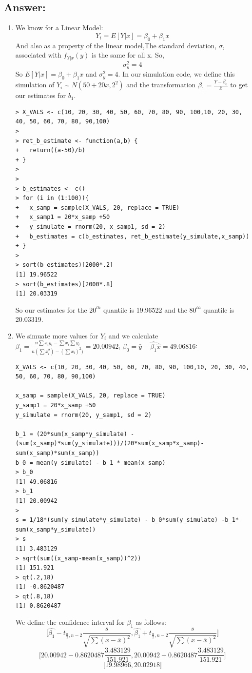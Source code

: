 \documentclass[svgnames]{article}
\begin{document}
\subsection*{Answer:}
\begin{enumerate}
\item 
We know for a Linear Model:
$$Y_i = E[Y|x] = \beta_0+\beta_1 x$$
And also as a property of the linear model,The standard deviation, $\sigma$, associated with $f_{Y|x}(y)$ is the same for all x.
So,
$$\sigma^2_y = 4 $$
So $E[Y|x] = \beta_0+\beta_1 x$ and $\sigma^2_y=4$. In our simulation code, we define this simulation of $Y_i\sim N( 50 +20 x,2^2)$ and the transformation $\beta_1 = \frac{Y-\beta_0}{\bar{x}}$ to get our estimates for $b_1$.
\begin{lstlisting}
> X_VALS <- c(10, 20, 30, 40, 50, 60, 70, 80, 90, 100,10, 20, 30, 40, 50, 60, 70, 80, 90,100)
>
> ret_b_estimate <- function(a,b) {
+   return((a-50)/b)
+ }
> 
> 
> b_estimates <- c()
> for (i in (1:100)){
+   x_samp = sample(X_VALS, 20, replace = TRUE)
+   x_samp1 = 20*x_samp +50
+   y_simulate = rnorm(20, x_samp1, sd = 2)
+   b_estimates = c(b_estimates, ret_b_estimate(y_simulate,x_samp))
+ }
> 
> sort(b_estimates)[2000*.2]
[1] 19.96522
> sort(b_estimates)[2000*.8]
[1] 20.03319
\end{lstlisting}
So our estimates for the $20^{th}$ quantile is 19.96522 and the $80^{th}$ quantile is 20.03319.
\item

We simuate more values for $Y_i$ and we calculate  $\beta_1= \frac{n\sum x_iy_i - \sum x_i \sum y_i}{n(\sum x_i^2)- (\sum x_i)^2)}=20.00942$, $\beta_0=\bar{y}- \hat{\beta_1}\hat{x}=49.06816$:
\begin{lstlisting}
X_VALS <- c(10, 20, 30, 40, 50, 60, 70, 80, 90, 100,10, 20, 30, 40, 50, 60, 70, 80, 90,100)

x_samp = sample(X_VALS, 20, replace = TRUE)
y_samp1 = 20*x_samp +50
y_simulate = rnorm(20, y_samp1, sd = 2)

b_1 = (20*sum(x_samp*y_simulate) - (sum(x_samp)*sum(y_simulate)))/(20*sum(x_samp*x_samp)-sum(x_samp)*sum(x_samp))
b_0 = mean(y_simulate) - b_1 * mean(x_samp)
> b_0
[1] 49.06816
> b_1
[1] 20.00942
> 
s = 1/18*(sum(y_simulate*y_simulate) - b_0*sum(y_simulate) -b_1* sum(x_samp*y_simulate))
> s
[1] 3.483129
> sqrt(sum((x_samp-mean(x_samp))^2))
[1] 151.921
> qt(.2,18)
[1] -0.8620487
> qt(.8,18)
[1] 0.8620487
\end{lstlisting}
We define the confidence interval for $\beta_1$ as follows:
$$\Big[ \hat{\beta_1} - t_{\frac{\alpha}{2},n-2} \frac{s}{\sqrt{\sum(x-\bar{x})^2}}, \hat{\beta_1} + t_{\frac{\alpha}{2},n-2} \frac{s}{\sqrt{\sum(x-\bar{x})^2}} \Big]$$
$$\Big[20.00942 - 0.8620487 \frac{3.483129}{151.921},  20.00942 + 0.8620487 \frac{3.483129}{151.921} \Big]$$
$$\Big[19.98966,20.02918]$$
\end{enumerate}
\end{document}
